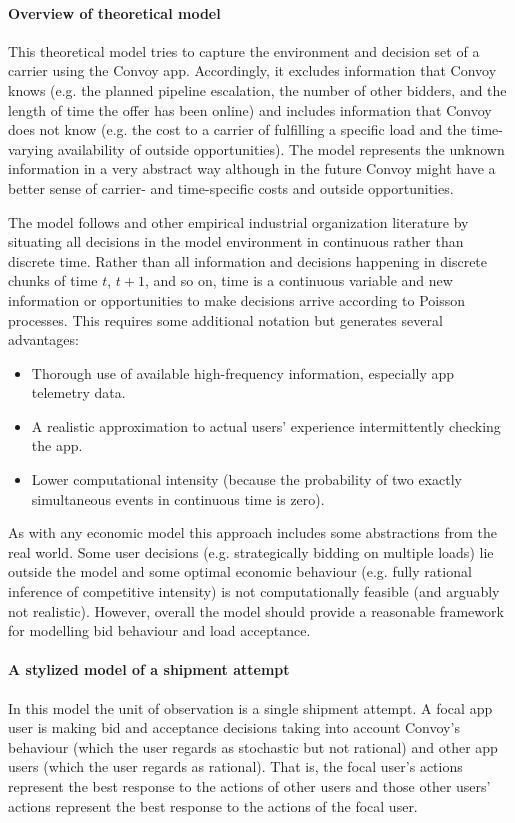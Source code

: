 \documentclass[12pt]{article}
\begin{document}
\paragraph{Overview of theoretical model}
This theoretical model tries to capture the environment and decision set of a carrier using the Convoy app. Accordingly, it excludes information that Convoy knows (e.g. the planned pipeline escalation, the number of other bidders, and the length of time the offer has been online) and includes information that Convoy does not know (e.g. the cost to a carrier of fulfilling a specific load and the time-varying availability of outside opportunities). The model represents the unknown information in a very abstract way although in the future Convoy might have a better sense of carrier- and time-specific costs and outside opportunities.

The model follows \cite{Arcidiacono2016} and other empirical industrial organization literature by situating all decisions in the model environment in continuous rather than discrete time. Rather than all information and decisions happening in discrete chunks of time $t$, $t+1$, and so on, time is a continuous variable and new information or opportunities to make decisions arrive according to Poisson processes. This requires some additional notation but generates several advantages:
\begin{itemize}
    \item Thorough use of available high-frequency information, especially app telemetry data.
    \item A realistic approximation to actual users' experience intermittently checking the app.
    \item Lower computational intensity (because the probability of two exactly simultaneous events in continuous time is zero). 
\end{itemize}

As with any economic model this approach includes some abstractions from the real world. Some user decisions (e.g. strategically bidding on multiple loads) lie outside the model and some optimal economic behaviour (e.g. fully rational inference of competitive intensity) is not computationally feasible (and arguably not realistic). However, overall the model should provide a reasonable framework for modelling bid behaviour and load acceptance.

\paragraph{A stylized model of a shipment attempt}
In this model the unit of observation is a single shipment attempt. A focal app user is making bid and acceptance decisions taking into account Convoy's behaviour (which the user regards as stochastic but not rational) and other app users (which the user regards as rational). That is, the focal user's actions represent the best response to the actions of other users and those other users' actions represent the best response to the actions of the focal user. 
\end{document}
